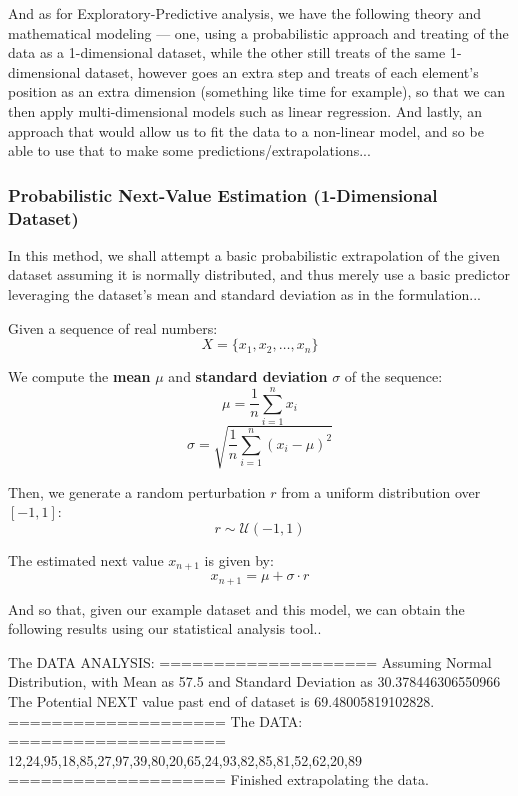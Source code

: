 \documentclass[a4paper, 18pt]{book} %
\begin{document}
And as for Exploratory-Predictive analysis, we have the following theory and mathematical modeling --- one, using a probabilistic approach and treating of the data as a 1-dimensional dataset, while the other still treats of the same 1-dimensional dataset, however goes an extra step and treats of each element's position as an extra dimension (something like time for example), so that we can then apply multi-dimensional models such as linear regression. And lastly, an approach that would allow us to fit the data to a non-linear model, and so be able to use that to make some predictions/extrapolations...



\subsubsection{Probabilistic Next-Value Estimation (1-Dimensional Dataset)}

In this method\cite{copilot_assistant}, we shall attempt a basic probabilistic extrapolation of the given dataset assuming it is normally distributed, and thus merely use a basic predictor leveraging the dataset's mean and standard deviation as in the formulation...

Given a sequence of real numbers:
\[
X = \{x_1, x_2, \dots, x_n\}
\]

We compute the \textbf{mean} \(\mu\) and \textbf{standard deviation} \(\sigma\) of the sequence:
\[
\mu = \frac{1}{n} \sum_{i=1}^{n} x_i
\]
\[
\sigma = \sqrt{ \frac{1}{n} \sum_{i=1}^{n} (x_i - \mu)^2 }
\]

Then, we generate a random perturbation \(r\) from a uniform distribution over \([-1, 1]\):
\[
r \sim \mathcal{U}(-1, 1)
\]

The estimated next value \(x_{n+1}\) is given by:
\[
x_{n+1} = \mu + \sigma \cdot r
\]


And so that, given our example dataset and this model, we can obtain the following results using our statistical analysis tool..



 \begin{tcbverbatim}[title=Sample OUTPUT DATA ANALYSIS (Predictive) of Dataset of 20 Random Numbers (Ages)]
The DATA ANALYSIS:
====================
Assuming Normal Distribution, with Mean as 57.5 and Standard Deviation as 30.378446306550966
The Potential NEXT value past end of dataset is 69.48005819102828.
====================
The DATA:
====================
12,24,95,18,85,27,97,39,80,20,65,24,93,82,85,81,52,62,20,89
====================
Finished extrapolating the data. 
  \end{tcbverbatim}
\end{document}
